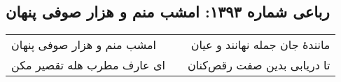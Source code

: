 \begin{center}
\section*{رباعی شماره ۱۳۹۳: امشب منم و هزار صوفی پنهان}
\label{sec:1393}
\begin{longtable}{l p{0.5cm} r}
امشب منم و هزار صوفی پنهان
&&
مانندهٔ جان جمله نهانند و عیان
\\
ای عارف مطرب هله تقصیر مکن
&&
تا دریابی بدین صفت رقص‌کنان
\\
\end{longtable}
\end{center}
